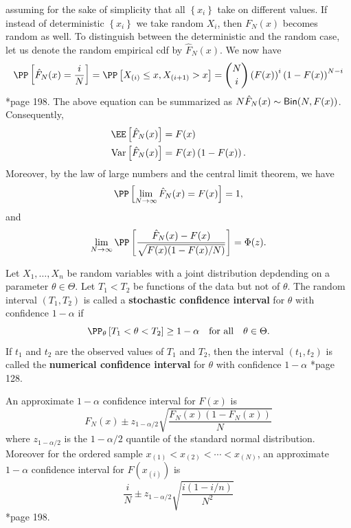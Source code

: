 assuming for the sake of simplicity that all $\left\{ x_i \right\}$ take on different values. If instead of deterministic $\left\{ x_i \right\}$ we take random $X_i$, then $F_N (x)$ becomes random as well. To distinguish between the deterministic and the random case, let us denote the random empirical cdf by $\hat{F}_{N} (x)$. We now have
\begin{equation*}
    \PP \left[ \hat{F}_{N} (x) = \frac{i}{N} \right] = \PP \left[ X_{(i)} \leq x , X_{(i+1)}  > x \right] = \binom{N}{i} \left( F(x) \right)^{i} \left( 1 - F(x) \right)^{N-i}
\end{equation*}
\cite{KroeseDirkP2013SMaC}*{page 198}. The above equation can be summarized as $N \hat{F}_{N} (x) \sim {\sf Bin} (N, F(x))$. Consequently,
\begin{align*}
    \EE \left[ \hat{F}_{N} (x) \right]  & = F(x)                          \\
    \Var \left[ \hat{F}_{N} (x) \right] & = F(x) \left( 1 - F(x) \right).
\end{align*}
Moreover, by the law of large numbers and the central limit theorem, we have
\begin{equation*}
    \PP \left[ \lim_{N \to \infty} \hat{F}_{N} (x) = F (x) \right] = 1,
\end{equation*}
and
\begin{equation*}
    \lim_{N \to \infty} \PP \left[ \frac{\hat{F}_{N} (x) - F(x)}{\sqrt{F(x)(1-F(x)/N)}} \right] = \Phi (z).
\end{equation*}

\begin{defe} \label{defe: confd_int}
    Let $X_1 , \ldots , X_n$ be random variables with a joint distribution depdending on a parameter $\theta \in \Theta$. Let $T_1 < T_2$ be functions of the data but not of $\theta$. The random interval $(T_1 , T_2)$ is called a {\bf stochastic confidence interval} for $\theta$ with confidence $1 - \alpha$ if
    \begin{equation*}
        \PP_{\theta} \left[ T_1 < \theta < T_2 \right] \geq 1 - \alpha \quad \text{for all} \quad \theta \in \Theta.
    \end{equation*}
    If $t_1$ and $t_2$ are the observed values of $T_1$ and $T_2$, then the interval $(t_1 , t_2)$ is called the {\bf numerical confidence interval} for $\theta$ with confidence $1 - \alpha$ \cite{KroeseDirkP2013SMaC}*{page 128}.
\end{defe}

An approximate $1 - \alpha$ confidence interval for $F(x)$ is
\begin{equation*}
    F_N (x) \pm z_{1 - \alpha / 2} \sqrt{\frac{F_N (x) (1 - F_N (x))}{N}}
\end{equation*}
where $z_{1 - \alpha / 2}$ is the $1 - \alpha / 2$ quantile of the standard normal distribution. Moreover for the ordered sample $x_{(1)} < x_{(2)} < \cdots < x_{(N)}$, an approximate $1 - \alpha$ confidence interval for $F(x_{(i)})$ is
\begin{equation*}
    \frac{i}{N} \pm z_{1 - \alpha / 2} \sqrt{\frac{i(1 - i/n)}{N^2}}
\end{equation*}
\cite{KroeseDirkP2013SMaC}*{page 198}.

